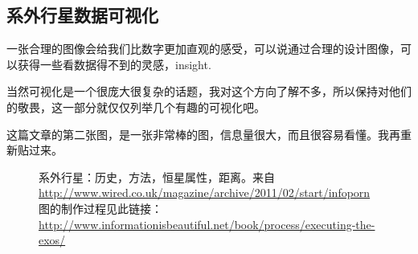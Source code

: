 \documentclass[letterpaper,10pt,english]{sphinxmanual}
\begin{document}
\subsection{系外行星数据可视化}
\label{intro:id19}
一张合理的图像会给我们比数字更加直观的感受，可以说通过合理的设计图像，可以获得一些看数据得不到的灵感，insight.

当然可视化是一个很庞大很复杂的话题，我对这个方向了解不多，所以保持对他们的敬畏，这一部分就仅仅列举几个有趣的可视化吧。

这篇文章的第二张图，是一张非常棒的图，信息量很大，而且很容易看懂。我再重新贴过来。
\begin{figure}[htbp]
\centering
\capstart

\caption{系外行星：历史，方法，恒星属性，距离。来自 \href{http://www.wired.co.uk/magazine/archive/2011/02/start/infoporn}{http://www.wired.co.uk/magazine/archive/2011/02/start/infoporn} 图的制作过程见此链接：\href{http://www.informationisbeautiful.net/book/process/executing-the-exos/}{http://www.informationisbeautiful.net/book/process/executing-the-exos/}}\end{figure}
\end{document}
